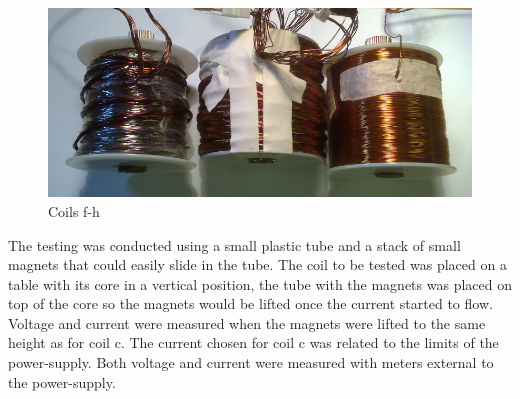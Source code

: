 \documentclass[]{../common/elementary-physics}
\begin{document}
\begin{figure}[ht] \centering
	\includegraphics[scale=1.7]{coils-f-h} \caption{Coils f-h}
\end{figure}

The testing was conducted using a small plastic tube and a stack of small magnets that could easily slide in the tube.
The coil to be tested was placed on a table with its core in a vertical position, the tube with the magnets was placed on top of the core so the magnets would be lifted once the current started to flow.
Voltage and current were measured when the magnets were lifted to the same height as for coil c.
The current chosen for coil c was related to the limits of the power-supply.
Both voltage and current were measured with meters external to the power-supply.
\end{document}
